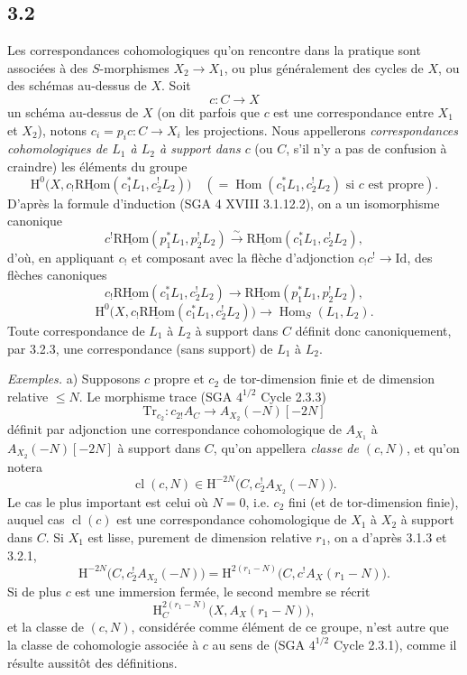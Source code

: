 \documentclass[11pt]{article}
\renewcommand{\H}{\mathrm{H}}
\DeclareMathOperator{\Hom}{Hom}
\newcommand{\R}{\mathrm{R}}\newcommand{\RHomCore}{\mathrm{RHom}}
\providecommand{\RHom}{\RHomCore}
\providecommand{\uRHom}{\underline{\RHom}}
\providecommand{\Id}{\mathrm{Id}}
\providecommand{\RHom}{\RHomCore}
\providecommand{\Hom}{\operatorname{Hom}}
\providecommand{\RHom}{\R\mathcal{H}om}
\providecommand{\R}{\mathrm R}
\providecommand{\RHom}{\RHomCore}
\providecommand{\Hom}{\operatorname{Hom}}
\begin{document}
\subsection*{3.2}
Les correspondances cohomologiques qu'on rencontre dans la pratique sont associées à des $S$-morphismes $X_2\to X_1$, ou plus généralement des cycles de $X$, ou des schémas au-dessus de $X$. Soit
\[
c:C\longrightarrow X
\]
un schéma au-dessus de $X$ (on dit parfois que $c$ est une correspondance entre $X_1$ et $X_2$), notons $c_i=p_ic:C\to X_i$ les projections. Nous appellerons \emph{correspondances cohomologiques de $L_1$ à $L_2$ à support dans $c$} (ou $C$, s'il n'y a pas de confusion à craindre) les éléments du groupe
\[
\H^0\bigl(X,c_!\uRHom(c_1^*L_1,c_2^!L_2)\bigr)
\quad(=\Hom(c_1^*L_1,c_2^!L_2)\text{ si }c\text{ est propre}).
\]
D'après la formule d'induction (SGA 4 XVIII 3.1.12.2), on a un isomorphisme canonique
\begin{equation}
c^!\uRHom(p_1^*L_1,p_2^!L_2)
\xrightarrow{\sim}
\uRHom(c_1^*L_1,c_2^!L_2),
\tag{3.2.1}
\end{equation}
d'où, en appliquant $c_!$ et composant avec la flèche d'adjonction $c_!c^!\to \Id$, des flèches canoniques
\begin{equation}
c_!\uRHom(c_1^*L_1,c_2^!L_2)
\longrightarrow
\uRHom(p_1^*L_1,p_2^!L_2),
\tag{3.2.2}
\end{equation}
\begin{equation}
\H^0\bigl(X,c_!\uRHom(c_1^*L_1,c_2^!L_2)\bigr)
\longrightarrow
\Hom_S(L_1,L_2).
\tag{3.2.3}
\end{equation}
Toute correspondance de $L_1$ à $L_2$ à support dans $C$ définit donc canoniquement, par 3.2.3, une correspondance (sans support) de $L_1$ à $L_2$.

\emph{Exemples.} a) Supposons $c$ propre et $c_2$ de tor-dimension finie et de dimension relative $\leq N$. Le morphisme trace (SGA $4^{1/2}$ Cycle 2.3.3)
\[
\mathrm{Tr}_{c_2}:c_{2!}A_C\longrightarrow A_{X_2}(-N)[-2N]
\]
définit par adjonction une correspondance cohomologique de $A_{X_1}$ à $A_{X_2}(-N)[-2N]$ à support dans $C$, qu'on appellera \emph{classe de $(c,N)$}, et qu'on notera
\begin{equation}
\operatorname{cl}(c,N)\in \H^{-2N}\bigl(C,c_2^!A_{X_2}(-N)\bigr).
\tag{3.2.4}
\end{equation}
Le cas le plus important est celui où $N=0$, i.e. $c_2$ fini (et de tor-dimension finie), auquel cas $\operatorname{cl}(c)$ est une correspondance cohomologique de $X_1$ à $X_2$ à support dans $C$. Si $X_1$ est lisse, purement de dimension relative $r_1$, on a d'après 3.1.3 et 3.2.1,
\begin{equation}
\H^{-2N}\bigl(C,c_2^!A_{X_2}(-N)\bigr)
=
\H^{2(r_1-N)}\bigl(C,c^!A_X(r_1-N)\bigr).
\tag{3.2.5}
\end{equation}
Si de plus $c$ est une immersion fermée, le second membre se récrit
\[
\H^{2(r_1-N)}_C\bigl(X,A_X(r_1-N)\bigr),
\]
et la classe de $(c,N)$, considérée comme élément de ce groupe, n'est autre que la classe de cohomologie associée à $c$ au sens de (SGA $4^{1/2}$ Cycle 2.3.1), comme il résulte aussitôt des définitions.
\end{document}
